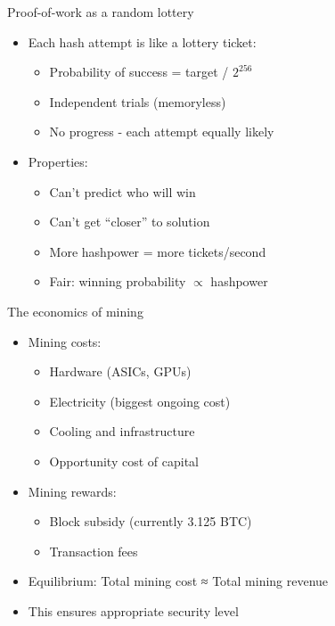 \documentclass[aspectratio=169, lualatex, handout]{beamer}
\begin{document}
\begin{frame}{Proof-of-work as a random lottery}
	\begin{itemize}
		\item Each hash attempt is like a lottery ticket:
		      \begin{itemize}
			      \item Probability of success = target / $2^{256}$
			      \item Independent trials (memoryless)
			      \item No progress - each attempt equally likely
		      \end{itemize}
		\item Properties:
		      \begin{itemize}
			      \item Can't predict who will win
			      \item Can't get ``closer'' to solution
			      \item More hashpower = more tickets/second
			      \item Fair: winning probability $\propto$ hashpower
		      \end{itemize}
	\end{itemize}
\end{frame}

\begin{frame}{The economics of mining}
	\begin{itemize}
		\item Mining costs:
		      \begin{itemize}
			      \item Hardware (ASICs, GPUs)
			      \item Electricity (biggest ongoing cost)
			      \item Cooling and infrastructure
			      \item Opportunity cost of capital
		      \end{itemize}
		\item Mining rewards:
		      \begin{itemize}
			      \item Block subsidy (currently 3.125 BTC)
			      \item Transaction fees
		      \end{itemize}
		\item Equilibrium: Total mining cost ≈ Total mining revenue
		\item This ensures appropriate security level
	\end{itemize}
\end{frame}
\end{document}

